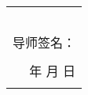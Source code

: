 \begin{table}[H]
\begin{tabular}{|rrrrrr|}
    \multicolumn{6}{|r|}{} \\
    \multicolumn{6}{|r|}{} \\
    \multicolumn{6}{|r|}{} \\
    \multicolumn{6}{|r|}{} \\
    \multicolumn{6}{|r|}{} \\
    \multicolumn{6}{|p{35.88em}|}{                                                                             \hfill 导师签名：\qquad\qquad\qquad\qquad\qquad\qquad\qquad\qquad } \\
    \multicolumn{6}{|r|}{} \\
    \multicolumn{6}{|p{35.88em}|}{\hfill 年 \qquad\quad 月 \qquad\quad 日 \qquad\qquad\qquad} \\
    \multicolumn{6}{|r|}{} \\
    \hline
    \end{tabular}
\end{table}

\renewcommand\arraystretch{1}
\restoregeometry